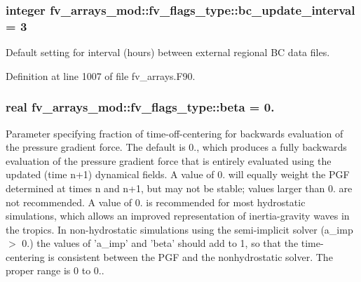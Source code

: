 \subsubsection[{bc\-\_\-update\-\_\-interval}]{\setlength{\rightskip}{0pt plus 5cm}integer fv\-\_\-arrays\-\_\-mod\-::fv\-\_\-flags\-\_\-type\-::bc\-\_\-update\-\_\-interval = 3}\label{structfv__arrays__mod_1_1fv__flags__type_a6504af6e717d93ba2f8ffbbfbed15c07}


Default setting for interval (hours) between external regional B\-C data files. 



Definition at line 1007 of file fv\-\_\-arrays.\-F90.

\subsubsection[{beta}]{\setlength{\rightskip}{0pt plus 5cm}real fv\-\_\-arrays\-\_\-mod\-::fv\-\_\-flags\-\_\-type\-::beta = 0.}\label{structfv__arrays__mod_1_1fv__flags__type_a63b5db0b645857933a373aa3cf2a5926}


Parameter specifying fraction of time-\/off-\/centering for backwards evaluation of the pressure gradient force. The default is 0., which produces a fully backwards evaluation of the pressure gradient force that is entirely evaluated using the updated (time n+1) dynamical fields. A value of 0. will equally weight the P\-G\-F determined at times n and n+1, but may not be stable; values larger than 0. are not recommended. A value of 0. is recommended for most hydrostatic simulations, which allows an improved representation of inertia-\/gravity waves in the tropics. In non-\/hydrostatic simulations using the semi-\/implicit solver (a\-\_\-imp $>$ 0.) the values of 'a\-\_\-imp' and 'beta' should add to 1, so that the time-\/centering is consistent between the P\-G\-F and the nonhydrostatic solver. The proper range is 0 to 0.. 



